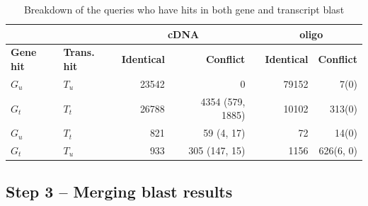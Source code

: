 \begin{table}[t]
	\centering
	\begin{footnotesize}
	\caption{Breakdown of the queries who have hits in both gene and transcript 
		blast} 
	\label{tab:magic-map-comparison}
	\begin{tabular}{@{}>{\centering\arraybackslash}p{1.7cm}
	>{\centering\arraybackslash}p{2cm} rrcrr}
	\toprule

	 &  &  \multicolumn{2}{c}{\textbf{cDNA}} & \phantom{a} & 
	\multicolumn{2}{c}{\textbf{oligo}} \\

	\cmidrule{3-4} \cmidrule{6-7}

	\textbf{Gene hit} & \textbf{Trans. hit} &
	\textbf{Identical} & \textbf{Conflict} 
	&& 
	\textbf{Identical} & \textbf{Conflict}  \\
	
	\midrule
	
	$G_u$ & $T_u$ & 23542 & 0 && 79152 & 7(0) \\
	$G_t$ & $T_t$ & 26788 & 4354 (579, 1885) && 10102 & 313(0) \\
	$G_u$ & $T_t$ & 821 & 59 (4, 17) && 72 & 14(0) \\
	$G_t$ & $T_u$ & 933 & 305 (147, 15) && 1156 & 626(6, 0) \\
	
%

%

	\bottomrule
	\end{tabular}
	\end{footnotesize}
\end{table}



\subsection{Step 3 – Merging blast results}


